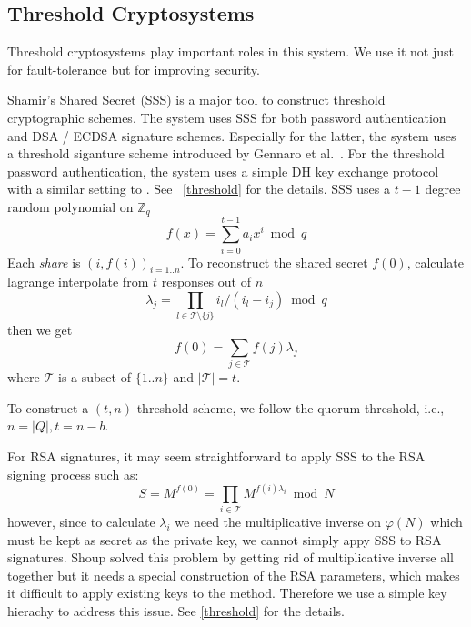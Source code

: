 \subsection{Threshold Cryptosystems}
Threshold cryptosystems play important roles in this system. We use it
not just for fault-tolerance but for improving security.

Shamir's Shared Secret (SSS) \cite{shamir} is a major tool to
construct threshold cryptographic schemes. The system uses SSS for
both password authentication and DSA / ECDSA signature
schemes. Especially for the latter, the system uses a threshold
siganture scheme introduced by Gennaro et al.\ \cite{Gennaro}. For the
threshold password authentication, the system uses a simple DH key
exchange protocol with a similar setting to \cite{ford}.
See ~\ref{threshold} for the details.
SSS uses a $t-1$ degree random polynomial on $\mathbb{Z}_q$
\[
  f(x) = \sum_{i=0}^{t-1}a_ix^i \bmod q
\]
Each {\em share} is $(i, f(i))_{i = 1..n}$. To reconstruct the shared
secret $f(0)$, calculate lagrange interpolate from $t$ responses out
of $n$
\[
    \lambda_j = \prod_{l \in \mathcal{T} \setminus \{j\}}
    i_l / (i_l - i_j) \bmod q
\]
then we get
\[
  f(0) = \sum_{j \in \mathcal{T}} f(j)\lambda_j
\]
where $\mathcal{T}$ is a subset of $\{1..n\}$ and $|\mathcal{T}| =
t$.

To construct a $(t, n)$ threshold scheme, we follow the quorum
threshold, i.e., $n = |Q|, t = n-b$.

For RSA signatures, it may seem straightforward to apply SSS to the
RSA signing process such as:
\[ S = M^{f(0)} = \prod_{i \in \mathcal{T}} M^{f(i)\lambda_i} \bmod N \]
however, since to calculate $\lambda_i$ we need the multiplicative
inverse on $\varphi(N)$ which must be kept as secret as the private
key, we cannot simply appy SSS to RSA signatures. Shoup \cite{shoup}
solved this problem by getting rid of multiplicative inverse all
together but it needs a special construction of the RSA parameters,
which makes it difficult to apply existing keys to the
method. Therefore we use a simple key hierachy to address this
issue. See \ref{threshold} for the details.

